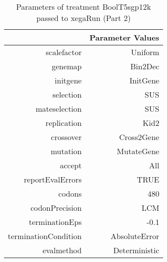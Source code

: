 \begin{table}[ht]
\centering
\begin{tabular}{rr}
  \hline
 & Parameter Values \\ 
  \hline
scalefactor & Uniform \\ 
  genemap & Bin2Dec \\ 
  initgene & InitGene \\ 
  selection & SUS \\ 
  mateselection & SUS \\ 
  replication & Kid2 \\ 
  crossover & Cross2Gene \\ 
  mutation & MutateGene \\ 
  accept & All \\ 
  reportEvalErrors & TRUE \\ 
  codons & 480 \\ 
  codonPrecision & LCM \\ 
  terminationEps & -0.1 \\ 
  terminationCondition & AbsoluteError \\ 
  evalmethod & Deterministic \\ 
   \hline
\end{tabular}
\caption{ Parameters of treatment BoolT5sgp12k passed to xegaRun
 (Part 2)} 
\end{table}
